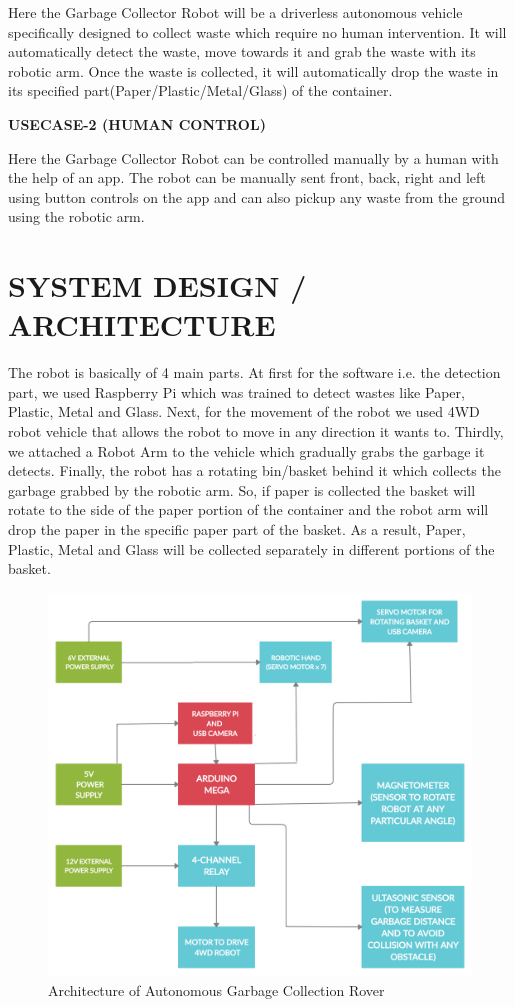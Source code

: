 \documentclass[conference]{IEEEtran}
\begin{document}
	Here the Garbage Collector Robot will be a driverless autonomous vehicle specifically designed to collect waste which require no human intervention. It will automatically detect the waste, move towards it and grab the waste with its robotic arm. Once the waste is collected, it will automatically drop the waste in its specified part(Paper/Plastic/Metal/Glass) of the container.\\
	
	\centerline{\textbf {USECASE-2 (HUMAN CONTROL)}}
	
	Here the Garbage Collector Robot can be controlled manually by a human with the help of an app. The robot can be manually sent front, back, right and left using button controls on the app and can also pickup any waste from the ground using the robotic arm.\\
	
	
	\section{SYSTEM DESIGN / ARCHITECTURE}\label{SCM}
	
	The robot is basically of 4 main parts. At first for the software i.e. the detection part, we used Raspberry Pi which was trained to detect wastes like Paper, Plastic, Metal and Glass. Next, for the movement of the robot we used 4WD robot vehicle that allows the robot to move in any direction it wants to. Thirdly, we attached a Robot Arm to the vehicle which gradually grabs the garbage it detects. Finally, the robot has a rotating bin/basket behind it which collects the garbage grabbed by the robotic arm. So, if paper is collected the basket will rotate to the side of the paper portion of the container and the robot arm will drop the paper in the specific paper part of the basket. As a result, Paper, Plastic, Metal and Glass will be collected separately in different portions of the basket.
	
	\begin{figure}[htbp]
		\centerline{\includegraphics[scale=0.1]{ARCHITECTURE.jpg}}
		\caption{Architecture of Autonomous Garbage Collection Rover}
		\label{fig}
	\end{figure}
	
\end{document}
